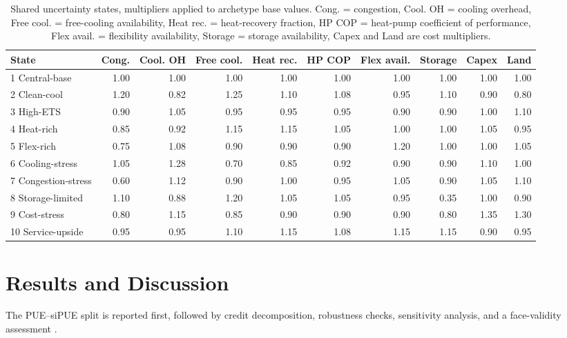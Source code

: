 \documentclass[preprint,12pt]{elsarticle}
\begin{document}
\begin{table}[tbp]
\centering
\tiny
\setlength{\tabcolsep}{2.5pt}
\caption{Shared uncertainty states, multipliers applied to archetype base values. Cong. = congestion, Cool. OH = cooling overhead, Free cool. = free-cooling availability, Heat rec. = heat-recovery fraction, HP COP = heat-pump coefficient of performance, Flex avail. = flexibility availability, Storage = storage availability, Capex and Land are cost multipliers.}
\label{tab:uncertainty-state-multipliers}
\begin{tabular}{l r r r r r r r r r}
\toprule
State & Cong. & Cool. OH & Free cool. & Heat rec. & HP COP & Flex avail. & Storage & Capex & Land \\
\midrule
1 Central-base & 1.00 & 1.00 & 1.00 & 1.00 & 1.00 & 1.00 & 1.00 & 1.00 & 1.00 \\
2 Clean-cool & 1.20 & 0.82 & 1.25 & 1.10 & 1.08 & 0.95 & 1.10 & 0.90 & 0.80 \\
3 High-ETS & 0.90 & 1.05 & 0.95 & 0.95 & 0.95 & 0.90 & 0.90 & 1.00 & 1.10 \\
4 Heat-rich & 0.85 & 0.92 & 1.15 & 1.15 & 1.05 & 1.00 & 1.00 & 1.05 & 0.95 \\
5 Flex-rich & 0.75 & 1.08 & 0.90 & 0.90 & 0.90 & 1.20 & 1.00 & 1.00 & 1.05 \\
6 Cooling-stress & 1.05 & 1.28 & 0.70 & 0.85 & 0.92 & 0.90 & 0.90 & 1.10 & 1.00 \\
7 Congestion-stress & 0.60 & 1.12 & 0.90 & 1.00 & 0.95 & 1.05 & 0.90 & 1.05 & 1.10 \\
8 Storage-limited & 1.10 & 0.88 & 1.20 & 1.05 & 1.05 & 0.95 & 0.35 & 1.00 & 0.90 \\
9 Cost-stress & 0.80 & 1.15 & 0.85 & 0.90 & 0.90 & 0.90 & 0.80 & 1.35 & 1.30 \\
10 Service-upside & 0.95 & 0.95 & 1.10 & 1.15 & 1.08 & 1.15 & 1.15 & 0.90 & 0.95 \\
\bottomrule
\end{tabular}
\end{table}

\section{Results and Discussion}
\label{sec:results}

The PUE--siPUE split is reported first, followed by credit decomposition, robustness checks, sensitivity analysis, and a face-validity assessment \cite{UptimeInstitute2024Survey,EUSmartCities2024Mantsala}.
\end{document}
